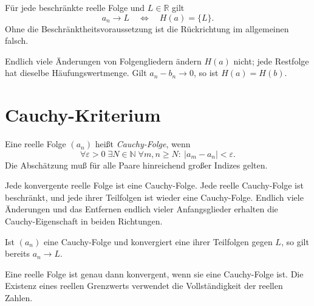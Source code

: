 \begin{theorem}
\label{b21guide:thm:unique-cluster}
Für jede beschränkte reelle Folge und $L\in\mathbb R$ gilt
\[
 a_n\to L\quad\Longleftrightarrow\quad H(a)=\{L\}.
\]
Ohne die Beschränktheitsvoraussetzung ist die Rückrichtung
im allgemeinen falsch.
\end{theorem}

\begin{theorem}
Endlich viele Änderungen von Folgengliedern ändern $H(a)$ nicht;
jede Restfolge hat dieselbe Häufungswertmenge.
Gilt $a_n-b_n\to0$, so ist $H(a)=H(b)$.
\end{theorem}

\section{Cauchy-Kriterium}

\begin{definition}
\label{b21guide:def:cauchy}
Eine reelle Folge $(a_n)$ heißt \emph{Cauchy-Folge}, wenn
\[
 \forall\varepsilon>0\;\exists N\in\mathbb N\;
 \forall m,n\geq N:\ |a_m-a_n|<\varepsilon.
\]
Die Abschätzung muß für alle Paare hinreichend großer Indizes gelten.
\end{definition}

\begin{theorem}
\label{b21guide:thm:cauchy-basic}
Jede konvergente reelle Folge ist eine Cauchy-Folge.
Jede reelle Cauchy-Folge ist beschränkt, und jede ihrer Teilfolgen
ist wieder eine Cauchy-Folge. Endlich viele Änderungen und
das Entfernen endlich vieler Anfangsglieder erhalten die
Cauchy-Eigenschaft in beiden Richtungen.
\end{theorem}

\begin{theorem}
Ist $(a_n)$ eine Cauchy-Folge und konvergiert eine ihrer
Teilfolgen gegen $L$, so gilt bereits $a_n\to L$.
\end{theorem}

\begin{theorem}
\label{b21guide:thm:cauchy-complete}
Eine reelle Folge ist genau dann konvergent, wenn sie eine Cauchy-Folge
ist. Die Existenz eines reellen Grenzwerts verwendet die Vollständigkeit
der reellen Zahlen.
\end{theorem}

